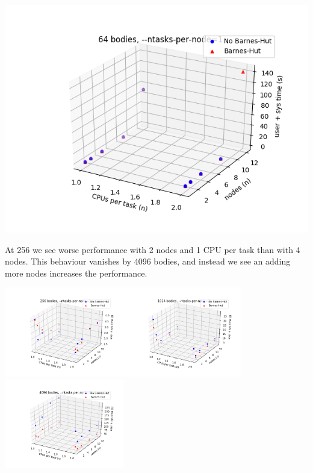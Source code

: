 \documentclass[11pt,a4paper]{article}
\begin{document}
\includegraphics[width=14.2cm]{64-cpusPerTask-nodes-just_1_tpn}

At 256 we see worse performance with 2 nodes and 1 CPU per task than with 4 nodes. This behaviour vanishes by 4096 bodies, and instead we see an adding more nodes increases the performance.

\includegraphics[width=5.2cm]{256-cpusPerTask-nodes-just_1_tpn}\includegraphics[width=5.2cm]{1024-cpusPerTask-nodes-just_1_tpn}\includegraphics[width=5.2cm]{4096-cpusPerTask-nodes-just_1_tpn}
\end{document}
